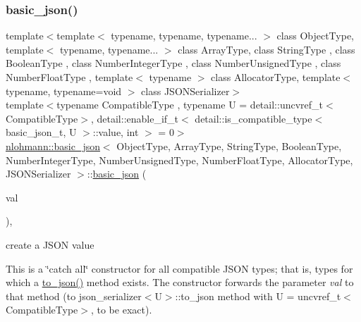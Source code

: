 \subsubsection{\texorpdfstring{basic\+\_\+json()}{basic\_json()}\hspace{0.1cm}{\footnotesize\ttfamily [3/9]}}
{\footnotesize\ttfamily template$<$template$<$ typename, typename, typename... $>$ class Object\+Type, template$<$ typename, typename... $>$ class Array\+Type, class String\+Type , class Boolean\+Type , class Number\+Integer\+Type , class Number\+Unsigned\+Type , class Number\+Float\+Type , template$<$ typename $>$ class Allocator\+Type, template$<$ typename, typename=void $>$ class J\+S\+O\+N\+Serializer$>$ \\
template$<$typename Compatible\+Type , typename U  = detail\+::uncvref\+\_\+t$<$\+Compatible\+Type$>$, detail\+::enable\+\_\+if\+\_\+t$<$ detail\+::is\+\_\+compatible\+\_\+type$<$ basic\+\_\+json\+\_\+t, U $>$\+::value, int $>$  = 0$>$ \\
\hyperlink{classnlohmann_1_1basic__json}{nlohmann\+::basic\+\_\+json}$<$ Object\+Type, Array\+Type, String\+Type, Boolean\+Type, Number\+Integer\+Type, Number\+Unsigned\+Type, Number\+Float\+Type, Allocator\+Type, J\+S\+O\+N\+Serializer $>$\+::\hyperlink{classnlohmann_1_1basic__json}{basic\+\_\+json} (\begin{DoxyParamCaption}\item[{Compatible\+Type \&\&}]{val }\end{DoxyParamCaption})\hspace{0.3cm}{\ttfamily [inline]}, {\ttfamily [noexcept]}}



create a J\+S\+ON value 

This is a \char`\"{}catch all\char`\"{} constructor for all compatible J\+S\+ON types; that is, types for which a {\ttfamily \hyperlink{namespacenlohmann_1_1detail_aa7a47b08eee864c2c108c04954919648}{to\+\_\+json()}} method exists. The constructor forwards the parameter {\itshape val} to that method (to {\ttfamily json\+\_\+serializer$<$U$>$\+::to\+\_\+json} method with {\ttfamily U = uncvref\+\_\+t$<$Compatible\+Type$>$}, to be exact).

